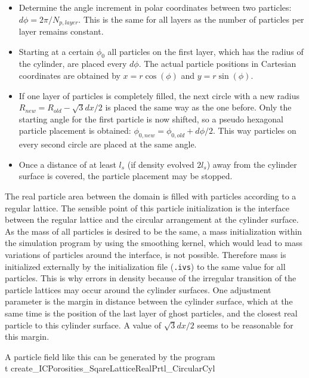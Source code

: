\documentclass[11pt,a4paper,twoside]{report}
\begin{document}
\begin{itemize}
\begin{itemize}
\item Determine the angle increment in polar coordinates between two particles:
  $d\phi=2\pi/N_{p,\mathit{layer}}$. This is the same for all layers as the number of particles per layer remains constant. 
 \item Starting at a certain $\phi_0$ all particles on the first layer, which has the radius of the cylinder, are placed every $d\phi$. The actual particle positions in Cartesian coordinates are obtained by $x=r \cos(\phi)$ and $y=r \sin(\phi)$.

\item If one layer of particles is completely filled, the next circle with a new radius $R_\mathit{new}=R_\mathit{old}-\sqrt{3}dx/2$ is placed the same way as the one before. Only the starting angle for the first particle is now shifted, so a pseudo hexagonal particle placement is obtained: $\phi_{0,\mathit{new}}=\phi_{0,\mathit{old}}+d\phi/2$. This way particles on every second circle are placed at the same angle.

\item Once a distance of at least $l_s$ (if density evolved $2l_s$) away from the cylinder surface is covered, the particle placement may be stopped.
  \end{itemize}
The real particle area between the domain is filled with particles according to a regular lattice. 
The sensible point of this particle initialization is the interface between the regular lattice and the circular arrangement at the cylinder surface.
As the mass of all particles is desired to be the same, a mass initialization within the simulation program by using the smoothing kernel, which would lead to mass variations of particles around the interface, is not possible. Therefore mass is initialized externally by the initialization file ({\tt .ivs}) to the same value for all particles. This is why errors in density because of the irregular transition of the particle lattices may occur around the cylinder surfaces.
One adjustment parameter is the margin in distance between the cylinder surface, which at the same time is the position of the last layer of ghost particles, and the closest real particle to this cylinder surface. A value of $\sqrt{3}dx/2$  seems to be reasonable for this margin.

A particle field like this can be generated by the program {\\t create\_ICPorosities\_SqareLatticeRealPrtl\_CircularCyl}  



\end{itemize}
\end{document}
